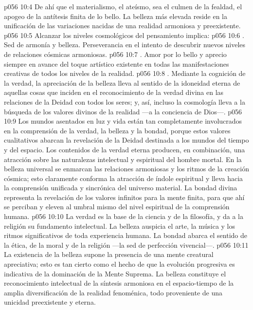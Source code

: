 \vs p056 10:4 De ahí que el materialismo, el ateísmo, sea el culmen de la fealdad, el apogeo de la antítesis finita de lo bello. La belleza más elevada reside en la unificación de las variaciones nacidas de una realidad armoniosa y preexistente.
\vs p056 10:5 Alcanzar los niveles cosmológicos del pensamiento implica:
\vs p056 10:6 . Sed de armonía y belleza. Perseverancia en el intento de descubrir nuevos niveles de relaciones cósmicas armoniosas.
\vs p056 10:7 . Amor por lo bello y aprecio siempre en avance del toque artístico existente en todas las manifestaciones creativas de todos los niveles de la realidad.
\vs p056 10:8 . Mediante la cognición de la verdad, la apreciación de la belleza lleva al sentido de la idoneidad eterna de aquellas cosas que inciden en el reconocimiento de la verdad divina en las relaciones de la Deidad con todos los seres; y, así, incluso la cosmología lleva a la búsqueda de los valores divinos de la realidad ---a la conciencia de Dios---.
\vs p056 10:9 \pc Los mundos asentados en luz y vida están tan completamente involucrados en la comprensión de la verdad, la belleza y la bondad, porque estos valores cualitativos abarcan la revelación de la Deidad destinada a los mundos del tiempo y del espacio. Los contenidos de la verdad eterna producen, en combinación, una atracción sobre las naturalezas intelectual y espiritual del hombre mortal. En la belleza universal se enmarcan las relaciones armoniosas y los ritmos de la creación cósmica; esto claramente conforma la atracción de índole espiritual y lleva hacia la comprensión unificada y sincrónica del universo material. La bondad divina representa la revelación de los valores infinitos para la mente finita, para que ahí se perciban y eleven al umbral mismo del nivel espiritual de la comprensión humana.
\vs p056 10:10 La verdad es la base de la ciencia y de la filosofía, y da a la religión su fundamento intelectual. La belleza auspicia el arte, la música y los ritmos significativos de toda experiencia humana. La bondad abarca el sentido de la ética, de la moral y de la religión ---la sed de perfección vivencial---.
\vs p056 10:11 La existencia de la belleza supone la presencia de una mente creatural apreciativa; esto es tan cierto como el hecho de que la evolución progresiva es indicativa de la dominación de la Mente Suprema. La belleza constituye el reconocimiento intelectual de la síntesis armoniosa en el espacio\hyp{}tiempo de la amplia diversificación de la realidad fenoménica, todo proveniente de una unicidad preexistente y eterna.
